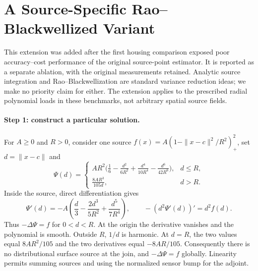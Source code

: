 \section{A Source-Specific Rao--Blackwellized Variant}
\label{app:analytic-source}

This extension was added after the first housing comparison exposed poor
accuracy--cost performance of the original source-point estimator. It is
reported as a separate ablation, with the original measurements retained.
Analytic source integration and Rao--Blackwellization are standard variance
reduction ideas; we make no priority claim for either. The extension applies
to the prescribed radial polynomial loads in these benchmarks, not arbitrary
spatial source fields.

\paragraph{Step 1: construct a particular solution.}
For $A\geq0$ and $R>0$, consider one source $f(x)=A(1-\|x-c\|^2/R^2)_+^2$, set $d=\|x-c\|$ and
\[
 \Psi(d)=\begin{cases}
 AR^2\bigl(\frac16-\frac{d^2}{6R^2}
  +\frac{d^4}{10R^4}-\frac{d^6}{42R^6}\bigr),&d\leq R,\\
 \frac{8AR^3}{105d},&d>R.
 \end{cases}
\]
Inside the source, direct differentiation gives
\[
 \Psi'(d)=-A\left(\frac d3-\frac{2d^3}{5R^2}
                              +\frac{d^5}{7R^4}\right),
 \qquad -(d^2\Psi'(d))'=d^2f(d).
\]
Thus $-\Delta\Psi=f$ for $0<d<R$. At the origin the derivative vanishes
and the polynomial is smooth. Outside $R$, $1/d$ is harmonic. At $d=R$,
the two values equal $8AR^2/105$ and the two derivatives equal $-8AR/105$.
Consequently there is no distributional surface source at the join, and
$-\Delta\Psi=f$ globally. Linearity permits summing sources and using the
normalized sensor bump for the adjoint.

